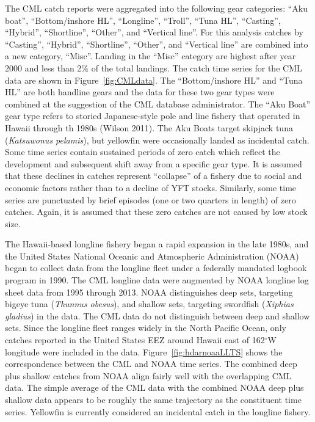 \documentclass[12pt,letterpaper]{article}
\renewcommand\deg[1]{$^\circ$#1}
\begin{document}
The CML catch reports were aggregated into the following gear categories:
``Aku boat'', ``Bottom/inshore HL'', ``Longline'',  ``Troll'', ``Tuna
HL'', ``Casting'', ``Hybrid'',  ``Shortline'', ``Other'', and
``Vertical line''.
For this analysis catches by ``Casting'', ``Hybrid'',
``Shortline'', ``Other'', and ``Vertical line'' are combined into a new
category, ``Misc''. Landing in the ``Misc'' category are highest after
year 2000 and less than  2\% of the total landings.
The catch time series for the CML data are shown in
Figure~\ref{fig:CMLdata}.
The ``Bottom/inshore HL'' and ``Tuna HL'' are both handline gears and
the data for these two gear types were combined at the suggestion of
the CML database administrator.
The ``Aku Boat'' gear type refers to storied Japanese-style pole and
line fishery that operated in Hawaii through th 1980s (Wilson 2011). 
The Aku Boats target skipjack tuna 
({\it Katsuwonus pelamis}), but yellowfin were occasionally landed as
incidental catch.
Some time series contain sustained periods of zero catch which
reflect the development and subsequent shift away from a specific
gear type. It is assumed that these declines in catches represent
``collapse'' of a fishery due to social and economic factors rather than
to a decline of YFT stocks.
Similarly, some time series are punctuated by brief episodes (one or two quarters in
length) of zero catches. Again, it is assumed that these zero catches
are not caused by low stock size.


The Hawaii-based longline fishery began a rapid expansion in the late
1980s, and the United States National Oceanic and Atmospheric Administration (NOAA)
began to collect data from the longline fleet under a
federally mandated logbook program in 1990. The CML longline data were
augmented by NOAA longline log sheet data from 1995 through 2013.
NOAA distinguishes deep sets, targeting bigeye tuna ({\it Thunnus
obesus}), and shallow sets,
targeting swordfish ({\it Xiphias gladius}) in the data. 
The CML data do not distinguish between deep and shallow sets.
Since the longline fleet ranges widely in the North Pacific Ocean,
only catches reported in the United States EEZ around Hawaii east of
162\deg{W} longitude were included in the data.
Figure~\ref{fig:hdarnoaaLLTS} shows the correspondence between the
CML and NOAA time series. The combined deep plus shallow catches from
NOAA align fairly well with the overlapping CML data. The simple
average of the CML data with the combined NOAA deep plus shallow data
appears to be roughly the same trajectory as the
constituent time series. Yellowfin is currently considered an incidental catch
in the longline fishery.
\end{document}
